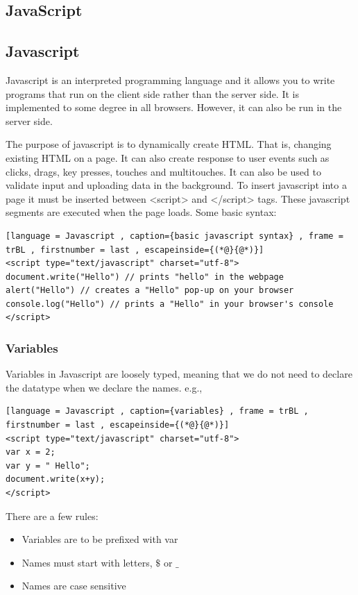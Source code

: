 \documentclass[a4paper]{article}
\theoremstyle{plain}
\theoremstyle{definition}
\newtheorem{defn}{Definition}[section]
\theoremstyle{remark}
\begin{document}
\begin{flushleft}
\section{JavaScript}
\subsection{Javascript}
\begin{tcolorbox}[colback=black!3!white,colframe=black!60!white,title=\begin{defn}Javascript \label{Javascript}\end{defn}]
Javascript is an interpreted programming language and it allows you to write programs that run on the client side rather than the server side. It is implemented to some degree in all browsers. However, it can also be run in the server side.
\end{tcolorbox}
The purpose of javascript is to dynamically create HTML. That is, changing existing HTML on a page. It can also create response to user events such as clicks, drags, key presses, touches and multitouches. It can also be used to validate input and uploading data in the background. To insert javascript into a page it must be inserted between <script> and </script> tags. These javascript segments are executed when the page loads. Some basic syntax:
\begin{lstlisting}[language = Javascript , caption={basic javascript syntax} , frame = trBL , firstnumber = last , escapeinside={(*@}{@*)}]
<script type="text/javascript" charset="utf-8">
document.write("Hello") // prints "hello" in the webpage
alert("Hello") // creates a "Hello" pop-up on your browser
console.log("Hello") // prints a "Hello" in your browser's console
</script>
\end{lstlisting}
\subsubsection{Variables}
Variables in Javascript are loosely typed, meaning that we do not need to declare the datatype when we declare the names. e.g.,
\begin{lstlisting}[language = Javascript , caption={variables} , frame = trBL , firstnumber = last , escapeinside={(*@}{@*)}]
<script type="text/javascript" charset="utf-8">
var x = 2;
var y = " Hello";
document.write(x+y);
</script>
\end{lstlisting}
There are a few rules:
\begin{itemize}
	\item Variables are to be prefixed with var
	\item Names must start with letters, $\$$ or $\_$
	\item Names are case sensitive
\end{itemize}

\end{flushleft}
\end{document}
